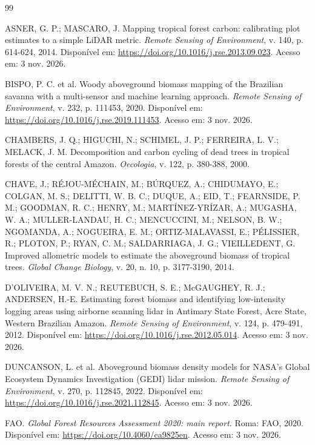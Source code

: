 \makeatletter
\renewcommand{\@biblabel}[1]{}
\makeatother
\begin{thebibliography}{99}
\setlength{\itemsep}{1em}
\setlength{\parindent}{0pt}
\renewcommand{\bibname}{Referências}

 ASNER, G. P.; MASCARO, J. Mapping tropical forest carbon:
calibrating plot estimates to a simple LiDAR metric. \textit{Remote Sensing of
Environment}, v. 140, p. 614-624, 2014. Disponível em:
\url{https://doi.org/10.1016/j.rse.2013.09.023}. Acesso em: 3 nov. 2026.

 BISPO, P. C. et al. Woody aboveground biomass mapping of the
Brazilian savanna with a multi-sensor and machine learning approach.
\textit{Remote Sensing of Environment}, v. 232, p. 111453, 2020. Disponível em:
\url{https://doi.org/10.1016/j.rse.2019.111453}. Acesso em: 3 nov. 2026.

 CHAMBERS, J. Q.; HIGUCHI, N.; SCHIMEL, J. P.; FERREIRA,
L. V.; MELACK, J. M. Decomposition and carbon cycling of dead trees in tropical
forests of the central Amazon. \textit{Oecologia}, v. 122, p. 380-388, 2000.

 CHAVE, J.; RÉJOU-MÉCHAIN, M.; BÚRQUEZ, A.; CHIDUMAYO, E.;
COLGAN, M. S.; DELITTI, W. B. C.; DUQUE, A.; EID, T.; FEARNSIDE, P. M.; GOODMAN,
R. C.; HENRY, M.; MARTÍNEZ-YRÍZAR, A.; MUGASHA, W. A.; MULLER-LANDAU, H. C.;
MENCUCCINI, M.; NELSON, B. W.; NGOMANDA, A.; NOGUEIRA, E. M.; ORTIZ-MALAVASSI,
E.; PÉLISSIER, R.; PLOTON, P.; RYAN, C. M.; SALDARRIAGA, J. G.; VIEILLEDENT, G.
Improved allometric models to estimate the aboveground biomass of tropical
trees. \textit{Global Change Biology}, v. 20, n. 10, p. 3177-3190, 2014.

 D'OLIVEIRA, M. V. N.; REUTEBUCH, S. E.; McGAUGHEY,
R. J.; ANDERSEN, H.-E. Estimating forest biomass and identifying low-intensity
logging areas using airborne scanning lidar in Antimary State Forest, Acre
State, Western Brazilian Amazon. \textit{Remote Sensing of Environment},
v. 124, p. 479-491, 2012. Disponível em:
\url{https://doi.org/10.1016/j.rse.2012.05.014}. Acesso em: 3 nov. 2026.

 DUNCANSON, L. et al. Aboveground biomass density
models for NASA's Global Ecosystem Dynamics Investigation (GEDI) lidar
mission. \textit{Remote Sensing of Environment}, v. 270, p. 112845, 2022.
Disponível em: \url{https://doi.org/10.1016/j.rse.2021.112845}. Acesso em:
3 nov. 2026.

 FAO. \textit{Global Forest Resources Assessment 2020: main
report}. Roma: FAO, 2020. Disponível em:
\url{https://doi.org/10.4060/ca9825en}. Acesso em: 3 nov. 2026.


\end{thebibliography}

